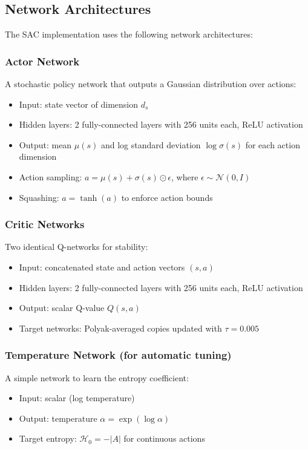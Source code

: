 \documentclass[11pt,a4paper]{article}
\begin{document}
\subsection{Network Architectures}
The SAC implementation uses the following network architectures:

\subsubsection{Actor Network}
A stochastic policy network that outputs a Gaussian distribution over actions:
\begin{itemize}
  \item Input: state vector of dimension $d_s$
  \item Hidden layers: 2 fully-connected layers with 256 units each, ReLU activation
  \item Output: mean $\mu(s)$ and log standard deviation $\log\sigma(s)$ for each action dimension
  \item Action sampling: $a = \mu(s) + \sigma(s) \odot \epsilon$, where $\epsilon \sim \mathcal{N}(0,I)$
  \item Squashing: $a = \tanh(a)$ to enforce action bounds
\end{itemize}

\subsubsection{Critic Networks}
Two identical Q-networks for stability:
\begin{itemize}
  \item Input: concatenated state and action vectors $(s, a)$
  \item Hidden layers: 2 fully-connected layers with 256 units each, ReLU activation
  \item Output: scalar Q-value $Q(s,a)$
  \item Target networks: Polyak-averaged copies updated with $\tau = 0.005$
\end{itemize}

\subsubsection{Temperature Network (for automatic tuning)}
A simple network to learn the entropy coefficient:
\begin{itemize}
  \item Input: scalar (log temperature)
  \item Output: temperature $\alpha = \exp(\log\alpha)$
  \item Target entropy: $\mathcal{H}_0 = -|A|$ for continuous actions
\end{itemize}
\end{document}
